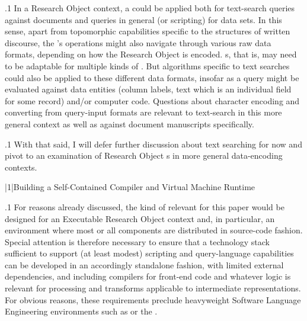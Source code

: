 \documentclass[11pt, twocolumn]{article}
\begin{document}
\p.1{%
In a Research Object context, a  could be applied both for
text-search queries against documents and queries in general
(or scripting) for data sets. In this sense, apart from
topomorphic capabilities specific to the structures of
written discourse, the 's operations might also navigate
through various raw data formats, depending on how the
Research Object is encoded. \lVM{}s, that is, may need to be
adaptable for multiple kinds of .
But algorithms specific to text searches could also
be applied to these different data formats, insofar as
a query might be evaluated against data entities
(column labels, text which is an individual field for some
record) and/or computer code. Questions about character
encoding and converting from query-input formats are relevant
to text-search in this more general context as well as against
document manuscripts specifically.
}%

\p.1{%
With that said, I will defer further discussion about text
searching for now and pivot to an examination of
Research Object s in more general data-encoding contexts.
}%


\s|1|{Building a Self-Contained Compiler and Virtual Machine Runtime}

\p.1{%
For reasons already discussed, the kind of  relevant for this
paper would be designed for an Executable Research Object
context and, in particular, an environment where
most or all components are distributed in source-code
fashion. Special attention is therefore necessary
to ensure that a technology stack sufficient to support (at least modest)
scripting and query-language capabilities can be developed
in an accordingly standalone fashion, with limited
external dependencies, and including compilers for front-end
code and whatever logic is relevant for processing and
transforms applicable to intermediate representations.
For obvious reasons, these requirements preclude
heavyweight Software Language Engineering environments
such as  or the .
}%
\end{document}
